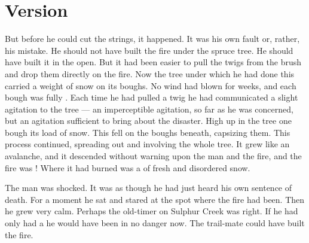 \documentclass{fiche}
\begin{document}
\newpage
\section{Version}

\begin{version}
But before he could cut the strings, it happened. It was his own fault or, rather, his
mistake. He should not have built the fire under the spruce tree. He should have built it in
the open. But it had been easier to pull the twigs from the brush and drop them directly on
the fire. Now the tree under which he had done this carried a weight of snow on its boughs. No
wind had blown for weeks, and each bough was fully . Each
time he had pulled a twig he had communicated a slight agitation to the tree --- an
imperceptible agitation, so far as he was concerned, but an agitation sufficient to bring
about the disaster. High up in the tree one bough  its load of snow. This fell on the boughs beneath, capsizing them. This
process continued, spreading out and involving the whole tree. It grew like an avalanche, and
it descended without warning upon the man and the fire, and the fire was
! Where it had burned was a
 of fresh and disordered snow.

The man was shocked. It was as though he had just heard his own sentence of death. For a
moment he sat and stared at the spot where the fire had been. Then he grew very calm. Perhaps
the old-timer on Sulphur Creek was right. If he had only had a
 he would have been in no danger now. The
trail-mate could have built the fire.
\end{version}

\end{document}
